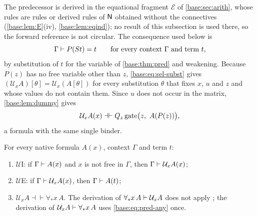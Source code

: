 The predecessor is derived in the equational fragment $\mathcal E$ of
\cref{base:sec:arith}, whose rules are rules or derived rules of $\mathsf{N}$
obtained without the connectives (\cref{base:lem:E}(iv),
\cref{base:lem:eqind}); no result of this subsection is used there, so the
forward reference is not circular.  The consequence used below is
\begin{equation}
 \Gamma\vdash P(S t)=t\qquad\text{for every context $\Gamma$ and term $t$,}
 \label{base:eq:pred-any}
\end{equation}
by substitution of $t$ for the variable of \cref{base:thm:pred} and
weakening.  Because $P(z)$ has no free variable other than $z$,
\eqref{base:eq:sel-subst} gives
$(\mathcal U_xA)[\theta]=\mathcal U_x(A[\theta])$ for every substitution
$\theta$ that fixes $x$, $u$ and $z$ and whose values do not contain them.
Since $u$ does not occur in the matrix, \cref{base:lem:dummy} gives
\begin{equation}
 \mathcal U_xA(x)\dashv\vdash Q_{z}\operatorname{gate}\bigl(z,\ A(P(z))\bigr),
 \label{base:eq:single-binder-q}
\end{equation}
a formula with the same single binder.

\begin{proposition}
\label{base:prop:single-binder}
For every native formula $A(x)$, context $\Gamma$ and term $t$:
\begin{enumerate}[label=\textup{(\roman*)}]
\item $\mathcal U$I: if $\Gamma\vdash A(x)$ and $x$ is not free in
 $\Gamma$, then $\Gamma\vdash\mathcal U_xA(x)$;
\item $\mathcal U$E: if $\Gamma\vdash\mathcal U_xA(x)$, then
 $\Gamma\vdash A(t)$;
\item $\mathcal U_xA\dashv\vdash\forall_* x\,A$.  The derivation of
 $\forall_* x\,A\vdash\mathcal U_xA$ does not apply ; the
 derivation of $\mathcal U_xA\vdash\forall_* x\,A$ uses
 \eqref{base:eq:pred-any} once.
\end{enumerate}
\end{proposition}

